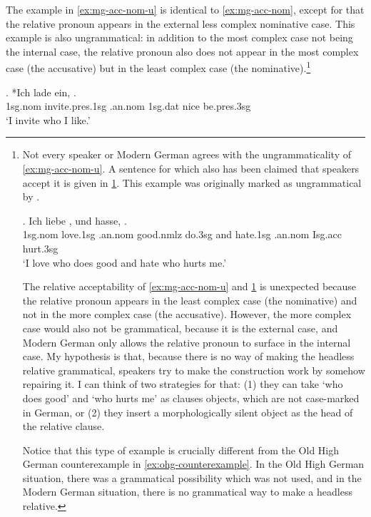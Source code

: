 The example in \ref{ex:mg-acc-nom-u} is identical to \ref{ex:mg-acc-nom}, except for that the relative pronoun appears in the external less complex nominative case. This example is also ungrammatical: in addition to the most complex case not being the internal case, the relative pronoun also does not appear in the most complex case (the accusative) but in the least complex case (the nominative).\footnote{
Not every speaker or Modern German agrees with the ungrammaticality of \ref{ex:mg-acc-nom-u}. A sentence for which also has been claimed that speakers accept it is given in \ref{ex:mg-liebe-hasse}. This example was originally marked as ungrammatical by .

\exg. Ich liebe   , und hasse,   .\\
1\ac{sg}.\ac{nom} love.1\ac{sg}\scsub{[acc]} .\ac{an}.\ac{nom} good.\ac{nmlz} do.3\ac{sg}\scsub{[nom]}
and hate.1\ac{sg}\scsub{[acc]} .\ac{an}.\ac{nom} I\ac{sg}.\ac{acc} hurt.3\ac{sg}\scsub{[nom]}\\
`I love who does good and hate who hurts me.' \label{ex:mg-liebe-hasse}

The relative acceptability of \ref{ex:mg-acc-nom-u} and \ref{ex:mg-liebe-hasse} is unexpected because the relative pronoun appears in the least complex case (the nominative) and not in the more complex case (the accusative). However, the more complex case would also not be grammatical, because it is the external case, and Modern German only allows the relative pronoun to surface in the internal case. My hypothesis is that, because there is no way of making the headless relative grammatical, speakers try to make the construction work by somehow repairing it. I can think of two strategies for that: (1) they can take  `who does good' and  `who hurts me' as clauses objects, which are not case-marked in German, or (2) they insert a morphologically silent object as the head of the relative clause.

Notice that this type of example is crucially different from the Old High German counterexample in \ref{ex:ohg-counterexample}. In the Old High German situation, there was a grammatical possibility which was not used, and in the Modern German situation, there is no grammatical way to make a headless relative.
}

\exg. *Ich {lade ein},    .\\
1\ac{sg}.\ac{nom} invite.\ac{pres}.1\ac{sg}\scsub{[acc]} .\ac{an}.\ac{nom} 1\ac{sg}.\ac{dat} nice be.\ac{pres}.3\ac{sg}\scsub{[nom]}\\
`I invite who I like.' \label{ex:mg-acc-nom-u}

